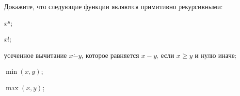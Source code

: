 Докажите, что следующие функции являются примитивно рекурсивными:
\begin{enumcyr}
    \item $x^y$;
    \item $x!$;
    \item усеченное вычитание $x \dot{-} y$, которое равняется $x - y$, если $x \ge y$ и нулю иначе;
    \item $\min(x, y)$;
    \item $\max(x, y)$;
\end{enumcyr}